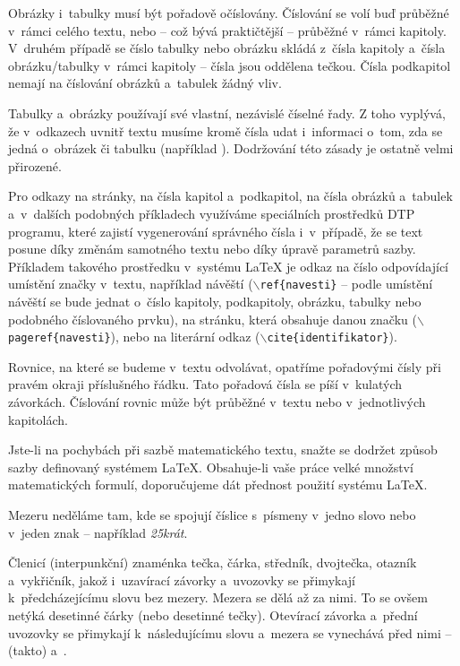 \begin{itemize}
Obrázky i~tabulky musí být pořadově očíslovány. Číslování se volí buď průběžné v~rámci celého textu, nebo -- což bývá praktičtější -- průběžné v~rámci kapitoly. V~druhém případě se číslo tabulky nebo obrázku skládá z~čísla kapitoly a~čísla obrázku/tabulky v~rámci kapitoly -- čísla jsou oddělena tečkou. Čísla podkapitol nemají na číslování obrázků a~tabulek žádný vliv.

Tabulky a~obrázky používají své vlastní, nezávislé číselné řady. Z toho vyplývá, že v~odkazech uvnitř textu musíme kromě čísla udat i~informaci o~tom, zda se jedná o~obrázek či tabulku (například ). Dodržování této zásady je ostatně velmi přirozené.

Pro odkazy na stránky, na čísla kapitol a~podkapitol, na čísla obrázků a~tabulek a~v~dalších podobných příkladech využíváme speciálních prostředků DTP programu, které zajistí vygenerování správného čísla i~v~případě, že se text posune díky změnám samotného textu nebo díky úpravě parametrů sazby. Příkladem takového prostředku v~systému LaTeX je odkaz na číslo odpovídající umístění značky v~textu, například návěští ($\backslash${\tt ref\{navesti\}} -- podle umístění návěští se bude jednat o~číslo kapitoly, podkapitoly, obrázku, tabulky nebo podobného číslovaného prvku), na stránku, která obsahuje danou značku ($\backslash${\tt pageref\{navesti\}}), nebo na literární odkaz ($\backslash${\tt cite\{identifikator\}}).

Rovnice, na které se budeme v~textu odvolávat, opatříme pořadovými čísly při pravém okraji příslušného řádku. Tato pořadová čísla se píší v~kulatých závorkách. Číslování rovnic může být průběžné v~textu nebo v~jednotlivých kapitolách.

Jste-li na pochybách při sazbě matematického textu, snažte se dodržet způsob sazby definovaný systémem LaTeX. Obsahuje-li vaše práce velké množství matematických formulí, doporučujeme dát přednost použití systému LaTeX.

Mezeru neděláme tam, kde se spojují číslice s~písmeny v~jedno slovo nebo v~jeden znak -- například {\it 25krát}.

Členicí (interpunkční) znaménka tečka, čárka, středník, dvojtečka, otazník a~vykřičník, jakož i~uzavírací závorky a~uvozovky se přimykají k~předcházejícímu slovu bez mezery. Mezera se dělá až za nimi. To se ovšem netýká desetinné čárky (nebo desetinné tečky). Otevírací závorka a~přední uvozovky se přimykají k~následujícímu slovu a~mezera se vynechává před nimi -- (takto) a~.


\end{itemize}
